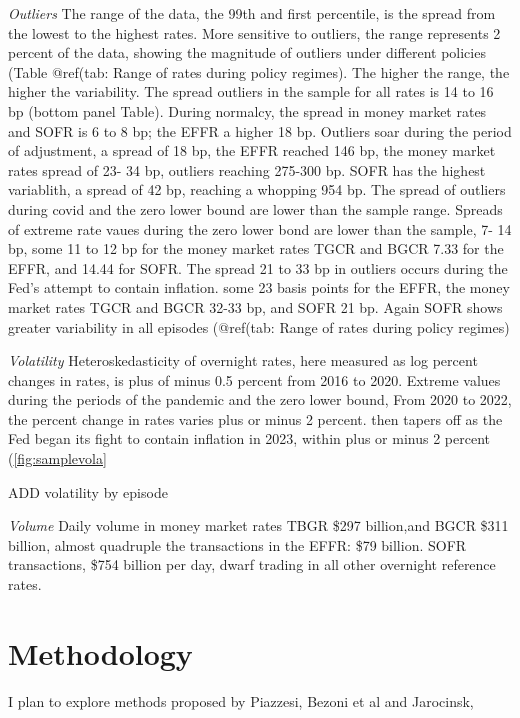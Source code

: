 \documentclass[
]{article}
\begin{document}
\emph{Outliers}
The range of the data, the 99th and first percentile, is the spread from the lowest to the highest rates. More sensitive to outliers, the range represents 2 percent of the data, showing the magnitude of outliers under different policies (Table @ref(tab: Range of rates during policy regimes). The higher the range, the higher the variability. The spread outliers in the sample for all rates is 14 to 16 bp (bottom panel Table). During normalcy, the spread in money market rates and SOFR is 6 to 8 bp; the EFFR a higher 18 bp. Outliers soar during the period of adjustment, a spread of 18 bp, the EFFR reached 146 bp, the money market rates spread of 23- 34 bp, outliers reaching 275-300 bp. SOFR has the highest variablith, a spread of 42 bp, reaching a whopping 954 bp. The spread of outliers during covid and the zero lower bound are lower than the sample range. Spreads of extreme rate vaues during the zero lower bond are lower than the sample, 7- 14 bp, some 11 to 12 bp for the money market rates TGCR and BGCR 7.33 for the EFFR, and 14.44 for SOFR. The spread 21 to 33 bp in outliers occurs during the Fed's attempt to contain inflation. some 23 basis points for the EFFR, the money market rates TGCR and BGCR 32-33 bp, and SOFR 21 bp. Again SOFR shows greater variability in all episodes (@ref(tab: Range of rates during policy regimes)

\emph{Volatility}
Heteroskedasticity of overnight rates, here measured as log percent changes in rates, is plus of minus 0.5 percent from 2016 to 2020. Extreme values during the periods of the pandemic and the zero lower bound, From 2020 to 2022, the percent change in rates varies plus or minus 2 percent. then tapers off as the Fed began its fight to contain inflation in 2023, within plus or minus 2 percent (\ref{fig:samplevola}

ADD volatility by episode

\emph{Volume}
Daily volume in money market rates TBGR \$297 billion,and BGCR \$311 billion, almost quadruple the transactions in the EFFR: \$79 billion. SOFR transactions, \$754 billion per day, dwarf trading in all other overnight reference rates.

\hypertarget{methodology}{%
\section{Methodology}\label{methodology}}

I plan to explore methods proposed by Piazzesi, Bezoni et al and Jarocinsk,
\end{document}
